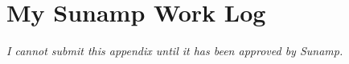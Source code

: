 
\chapter{My Sunamp Work Log} %

\label{App:Log} %


%

\emph{I cannot submit this appendix until it has been approved by Sunamp.}


